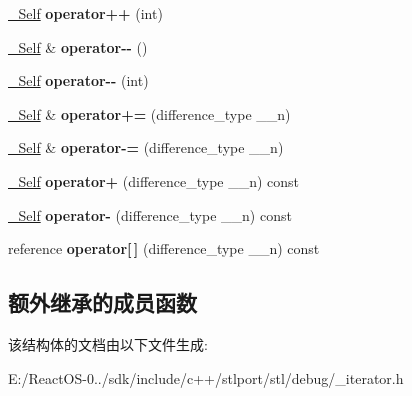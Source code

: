\begin{DoxyCompactItemize}
\hyperlink{struct___d_b_g__iter}{\+\_\+\+Self} {\bfseries operator++} (int)
\item 
\mbox{\label{struct___d_b_g__iter_ab249c24bd0884fa8f8bf982fc25fa9ce}} 
\hyperlink{struct___d_b_g__iter}{\+\_\+\+Self} \& {\bfseries operator-\/-\/} ()
\item 
\mbox{\label{struct___d_b_g__iter_a2e94065c42d41b738a775305bfc8c717}} 
\hyperlink{struct___d_b_g__iter}{\+\_\+\+Self} {\bfseries operator-\/-\/} (int)
\item 
\mbox{\label{struct___d_b_g__iter_ab7df9eea76548cde5772791437335203}} 
\hyperlink{struct___d_b_g__iter}{\+\_\+\+Self} \& {\bfseries operator+=} (difference\+\_\+type \+\_\+\+\_\+n)
\item 
\mbox{\label{struct___d_b_g__iter_a12b6c2ba701a85552aec7ff1efcdf161}} 
\hyperlink{struct___d_b_g__iter}{\+\_\+\+Self} \& {\bfseries operator-\/=} (difference\+\_\+type \+\_\+\+\_\+n)
\item 
\mbox{\label{struct___d_b_g__iter_adb3b520579569badeab35e2e4a9f1173}} 
\hyperlink{struct___d_b_g__iter}{\+\_\+\+Self} {\bfseries operator+} (difference\+\_\+type \+\_\+\+\_\+n) const
\item 
\mbox{\label{struct___d_b_g__iter_a256c11e977fd984a9186902975f87cb2}} 
\hyperlink{struct___d_b_g__iter}{\+\_\+\+Self} {\bfseries operator-\/} (difference\+\_\+type \+\_\+\+\_\+n) const
\item 
\mbox{\label{struct___d_b_g__iter_a90ab4dcc96947055859689f6227a96b2}} 
reference {\bfseries operator\mbox{[}$\,$\mbox{]}} (difference\+\_\+type \+\_\+\+\_\+n) const
\end{DoxyCompactItemize}
\subsection*{额外继承的成员函数}


该结构体的文档由以下文件生成\+:\begin{DoxyCompactItemize}
\item 
E\+:/\+React\+O\+S-\/0../sdk/include/c++/stlport/stl/debug/\+\_\+iterator.\+h\end{DoxyCompactItemize}

